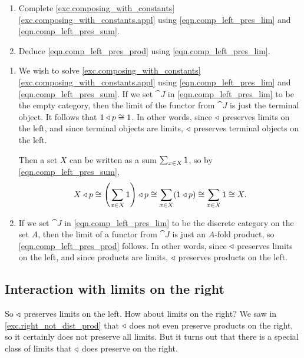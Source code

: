 \documentclass[Book-Poly]{subfiles}
\begin{document}
\begin{exercise} \label{exc.comp_left_pres_lim}
\begin{enumerate}
    \item Complete \cref{exc.composing_with_constants} \cref{exc.composing_with_constants.appl} using \eqref{eqn.comp_left_pres_lim} and \eqref{eqn.comp_left_pres_sum}.
    \item \label{exc.comp_left_pres_lim.prod} Deduce \eqref{eqn.comp_left_pres_prod} using \eqref{eqn.comp_left_pres_lim}.\qedhere
\end{enumerate}
\begin{solution}
\begin{enumerate}
    \item We wish to solve \cref{exc.composing_with_constants} \cref{exc.composing_with_constants.appl} using \eqref{eqn.comp_left_pres_lim} and \eqref{eqn.comp_left_pres_sum}.
    If we set $\cat{J}$ in \eqref{eqn.comp_left_pres_lim} to be the empty category, then the limit of the functor from $\cat{J}$ is just the terminal object.
    It follows that $\textsf{1}\mathbin{\triangleleft} p\cong\textsf{1}$.
    In other words, since $\mathbin{\triangleleft}$ preserves limits on the left, and since terminal objects are limits, $\mathbin{\triangleleft}$ preserves terminal objects on the left.

    Then a set $X$ can be written as a sum $\sum_{x\in X}\textsf{1}$, so by \eqref{eqn.comp_left_pres_sum},
    \[
        X\mathbin{\triangleleft} p\cong\left(\sum_{x\in X}\textsf{1}\right)\mathbin{\triangleleft} p\cong\sum_{x\in X}(\textsf{1}\mathbin{\triangleleft} p)\cong\sum_{x\in X}\textsf{1}\cong X.
    \]

    \item If we set $\cat{J}$ in \eqref{eqn.comp_left_pres_lim} to be the discrete category on the set $A$, then the limit of a functor from $\cat{J}$ is just an $A$-fold product, so \eqref{eqn.comp_left_pres_prod} follows.
    In other words, since $\mathbin{\triangleleft}$ preserves limits on the left, and since products are limits, $\mathbin{\triangleleft}$ preserves products on the left.
\end{enumerate}
\end{solution}
\end{exercise}


\subsection{Interaction with limits on the right} \label{subsec.comon.comp.prop.lim_right}

So $\mathbin{\triangleleft}$ preserves limits on the left.
How about limits on the right?
We saw in \cref{exc.right_not_dist_prod} that $\mathbin{\triangleleft}$ does not even preserve products on the right, so it certainly does not preserve all limits.
But it turns out that there is a special class of limits that $\mathbin{\triangleleft}$ does preserve on the right.
\end{document}
